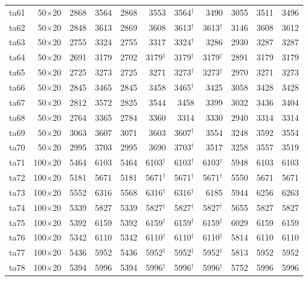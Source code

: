 {\begin{longtable}{lrrrrrrrrrr}
ta61 & 50$\times$20 & 2868 & 3564 & 2868 & 3553 & 3564$^\dagger$ & 3490 & 3055 & 3511 & 3496 \\
ta62 & 50$\times$20 & 2848 & 3613 & 2869 & 3608 & 3613$^\dagger$ & 3613$^\dagger$ & 3146 & 3608 & 3612 \\
ta63 & 50$\times$20 & 2755 & 3324 & 2755 & 3317 & 3324$^\dagger$ & 3286 & 2930 & 3287 & 3287 \\
ta64 & 50$\times$20 & 2691 & 3179 & 2702 & 3179$^\dagger$ & 3179$^\dagger$ & 3179$^\dagger$ & 2891 & 3179 & 3179 \\
ta65 & 50$\times$20 & 2725 & 3273 & 2725 & 3271 & 3273$^\dagger$ & 3273$^\dagger$ & 2970 & 3271 & 3273 \\
ta66 & 50$\times$20 & 2845 & 3465 & 2845 & 3458 & 3465$^\dagger$ & 3425 & 3058 & 3428 & 3428 \\
ta67 & 50$\times$20 & 2812 & 3572 & 2825 & 3544 & 3458 & 3399 & 3032 & 3436 & 3404 \\
ta68 & 50$\times$20 & 2764 & 3365 & 2784 & 3360 & 3314 & 3330 & 2940 & 3314 & 3314 \\
ta69 & 50$\times$20 & 3063 & 3607 & 3071 & 3603 & 3607$^\dagger$ & 3554 & 3248 & 3592 & 3554 \\
ta70 & 50$\times$20 & 2995 & 3703 & 2995 & 3690 & 3703$^\dagger$ & 3517 & 3258 & 3557 & 3519 \\
ta71 & 100$\times$20 & 5464 & 6103 & 5464 & 6103$^\dagger$ & 6103$^\dagger$ & 6103$^\dagger$ & 5948 & 6103 & 6103 \\
ta72 & 100$\times$20 & 5181 & 5671 & 5181 & 5671$^\dagger$ & 5671$^\dagger$ & 5671$^\dagger$ & 5550 & 5671 & 5671 \\
ta73 & 100$\times$20 & 5552 & 6316 & 5568 & 6316$^\dagger$ & 6316$^\dagger$ & 6185 & 5944 & 6256 & 6263 \\
ta74 & 100$\times$20 & 5339 & 5827 & 5339 & 5827$^\dagger$ & 5827$^\dagger$ & 5827$^\dagger$ & 5655 & 5827 & 5827 \\
ta75 & 100$\times$20 & 5392 & 6159 & 5392 & 6159$^\dagger$ & 6159$^\dagger$ & 6159$^\dagger$ & 6029 & 6159 & 6159 \\
ta76 & 100$\times$20 & 5342 & 6110 & 5342 & 6110$^\dagger$ & 6110$^\dagger$ & 6110$^\dagger$ & 5814 & 6110 & 6110 \\
ta77 & 100$\times$20 & 5436 & 5952 & 5436 & 5952$^\dagger$ & 5952$^\dagger$ & 5952$^\dagger$ & 5813 & 5952 & 5952 \\
ta78 & 100$\times$20 & 5394 & 5996 & 5394 & 5996$^\dagger$ & 5996$^\dagger$ & 5996$^\dagger$ & 5752 & 5996 & 5996 \\

\end{longtable}}
